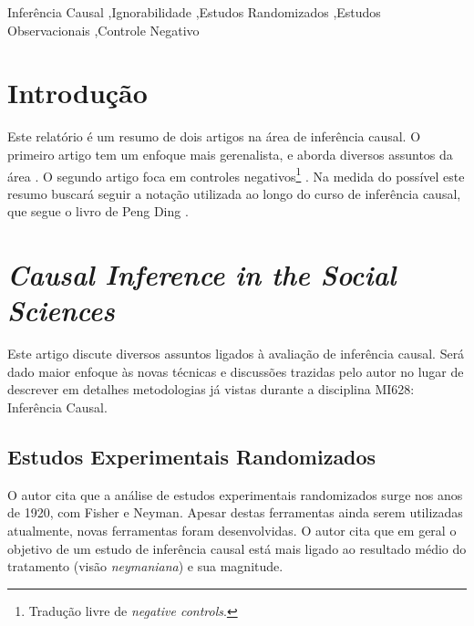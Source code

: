 \documentclass[final,5p]{elsarticle}
\numberwithin{equation}{section}
\begin{document}
\begin{frontmatter}
\begin{keyword}
    Inferência Causal \sep Ignorabilidade \sep Estudos Randomizados \sep Estudos Observacionais \sep Controle Negativo



\end{keyword}

\end{frontmatter}

\section{Introdução}

    Este relatório é um resumo de dois artigos na área de inferência causal. O primeiro artigo tem um enfoque mais gerenalista, e aborda diversos assuntos da área \cite{imbens2024causal}. O segundo artigo foca em controles negativos\footnote{Tradução livre de \emph{negative controls}.} \cite{lipsitch2010negative}. Na medida do possível este resumo buscará seguir a notação utilizada ao longo do curso de inferência causal, que segue o livro de Peng Ding \cite{ding2023first}.

\section{\textit{Causal Inference in the Social Sciences}}

    Este artigo discute diversos assuntos ligados à avaliação de inferência causal. Será dado maior enfoque às novas técnicas e discussões trazidas pelo autor no lugar de descrever em detalhes metodologias já vistas durante a disciplina MI628: Inferência Causal.

    \subsection{Estudos Experimentais Randomizados}

    O autor cita que a análise de estudos experimentais randomizados surge nos anos de 1920, com Fisher e Neyman. Apesar destas ferramentas ainda serem utilizadas atualmente, novas ferramentas foram desenvolvidas. O autor cita que em geral o objetivo de um estudo de inferência causal está mais ligado ao resultado médio do tratamento (visão \textit{neymaniana}) e sua magnitude.
\end{document}
